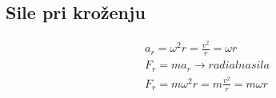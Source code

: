{\color{indiagreen}\subsection{Sile pri kroženju}}
\begin{align*}
	a_r = \omega^2r = \frac{v^2}{r} = \omega r\\
	F_r = ma_r \rightarrow radialna sila\\
	F_r = m\omega^2r = m\frac{v^2}{r} = m\omega r
\end{align*}
